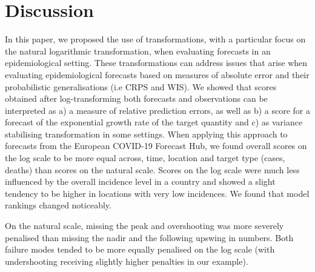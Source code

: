 \documentclass{article}
\begin{document}
\section{Discussion}
\label{sec:discussion}

In this paper, we proposed the use of transformations, with a particular focus on the natural logarithmic transformation, when evaluating forecasts in an epidemiological setting. These transformations can address issues that arise when evaluating epidemiological forecasts based on measures of absolute error and their probabilistic generalisations (i.e CRPS and WIS). We showed that scores obtained after log-transforming both forecasts and observations can be interpreted as a) a measure of relative prediction errors, as well as b) a score for a forecast of the exponential growth rate of the target quantity and c) as variance stabilising transformation in some settings.
When applying this approach to forecasts from the European COVID-19 Forecast Hub, we found overall scores on the log scale to be more equal across, time, location and target type (cases, deaths) than scores on the natural scale. Scores on the log scale were much less influenced by the overall incidence level in a country and showed a slight tendency to be higher in locations with very low incidences. We found that model rankings changed noticeably. 

On the natural scale, missing the peak and overshooting was more severely penalised than missing the nadir and the following upswing in numbers. Both failure modes tended to be more equally penalised on the log scale (with undershooting receiving slightly higher penalties in our example). 
\end{document}
